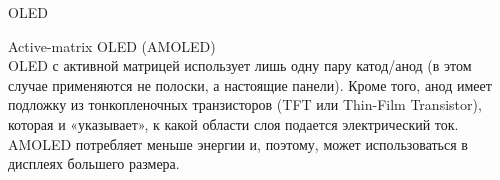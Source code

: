 \documentclass{beamer}
\begin{document}
\begin{frame}{OLED}
{			\vspace{0.15cm}
			Active-matrix OLED (AMOLED)\\
			OLED с активной матрицей использует лишь одну пару катод/анод (в этом случае применяются не полоски, а настоящие панели). 
			Кроме того, анод имеет подложку из тонкопленочных транзисторов (TFT или Thin-Film Transistor), которая и «указывает», к какой области слоя подается электрический ток. 
			AMOLED потребляет меньше энергии и, поэтому, может использоваться в дисплеях большего размера. 

		}

			
	\end{frame}


			





\end{document}
